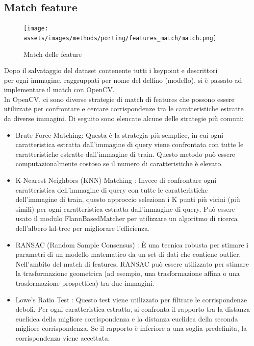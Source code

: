 \documentclass[a4paper,12pt]{report}
\begin{document}
      \subsection{Match feature}
      \begin{figure}[H]
        \centering
        \centering
        \texttt{[image: assets/images/methods/porting/features\_match/match.png]}   
        \caption{Match delle feature}
      \end{figure}


      Dopo il salvataggio del dataset contenente tutti i keypoint e descrittori 
      \\ per ogni immagine, raggruppati per nome del delfino (modello), si è passato ad implementare il match con OpenCV. \\
      In OpenCV, ci sono diverse strategie di match di features che possono essere utilizzate per confrontare e cercare corrispondenze tra le caratteristiche estratte da diverse immagini. Di seguito sono elencate alcune delle strategie più comuni:

      \begin{itemize}
        \item Brute-Force Matching: Questa è la strategia più semplice, in cui ogni caratteristica estratta dall'immagine di query viene confrontata con tutte le caratteristiche estratte dall'immagine di train. Questo metodo può essere computazionalmente costoso se il numero di caratteristiche è elevato.
        \newpage
        \item K-Nearest Neighbors (KNN) Matching \cite{knn}: Invece di confrontare ogni caratteristica dell'immagine di query con tutte le caratteristiche dell'immagine di train, questo approccio seleziona i K punti più vicini (più simili) per ogni caratteristica estratta dall'immagine di query. Può essere usato il modulo FlannBasedMatcher per utilizzare un algoritmo di ricerca dell'albero kd-tree per migliorare l'efficienza.
        \item RANSAC (Random Sample Consensus) \cite{ransac}: È una tecnica robusta per stimare i parametri di un modello matematico da un set di dati che contiene outlier. Nell'ambito del match di features, RANSAC può essere utilizzato per stimare la trasformazione geometrica (ad esempio, una trasformazione affina o una trasformazione prospettica) tra due immagini.
        \item Lowe's Ratio Test \cite{lowe2004distinctive}: Questo test viene utilizzato per filtrare le corrispondenze deboli. Per ogni caratteristica estratta, si confronta il rapporto tra la distanza euclidea della migliore corrispondenza e la distanza euclidea della seconda migliore corrispondenza. Se il rapporto è inferiore a una soglia predefinita, la corrispondenza viene accettata.
      \end{itemize}
\end{document}
